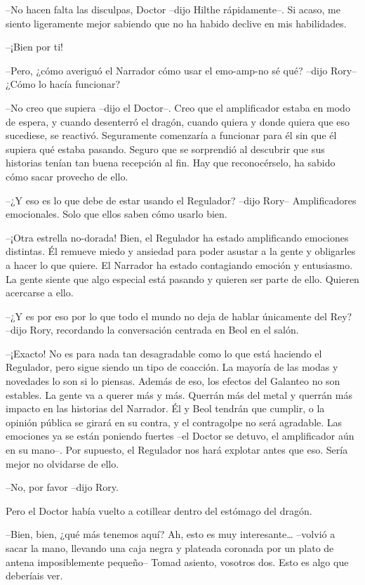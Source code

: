 {--No hacen falta las disculpas, Doctor --dijo Hilthe rápidamente--.
	Si acaso, me siento ligeramente mejor sabiendo que no ha habido declive
en mis habilidades.}

{--¡Bien por ti!}

{--Pero, ¿cómo averiguó el Narrador cómo usar el emo-amp-no sé qué?
--dijo Rory-- ¿Cómo lo hacía funcionar?}

{--No creo que supiera --dijo el Doctor--. Creo que el amplificador
	estaba en modo de espera, y cuando desenterró el dragón, cuando quiera y
	donde quiera que eso sucediese, se reactivó. Seguramente comenzaría a
	funcionar para él sin que él supiera qué estaba pasando. Seguro que se
	sorprendió al descubrir que sus historias tenían tan buena recepción al
fin. Hay que reconocérselo, ha sabido cómo sacar provecho de ello.}

{--¿Y eso es lo que debe de estar usando el Regulador? --dijo Rory--
Amplificadores emocionales. Solo que ellos saben cómo usarlo bien.}

{--¡Otra estrella no-dorada! Bien, el Regulador ha estado amplificando
	emociones distintas. Él remueve miedo y ansiedad para poder asustar a la
	gente y obligarles a hacer lo que quiere. El Narrador ha estado
	contagiando emoción y entusiasmo. La gente siente que algo especial está
pasando y quieren ser parte de ello. Quieren acercarse a ello.}

{--¿Y es por eso por lo que todo el mundo no deja de hablar únicamente
	del Rey? --dijo Rory, recordando la conversación centrada en Beol en el
salón.}

{--¡Exacto! No es para nada tan desagradable como lo que está haciendo
	el Regulador, pero sigue siendo un tipo de coacción. La mayoría de las
	modas y novedades lo son si lo piensas. Además de eso, los efectos del
	Galanteo no son estables. La gente va a querer más y más. Querrán más
	del metal y querrán más impacto en las historias del Narrador. Él y Beol
	tendrán que cumplir, o la opinión pública se girará en su contra, y el
	contragolpe no será agradable. Las emociones ya se están poniendo
	fuertes --el Doctor se detuvo, el amplificador aún en su mano--. Por
	supuesto, el Regulador nos hará explotar antes que eso. Sería mejor no
olvidarse de ello.}

{--No, por favor --dijo Rory.}

{Pero el Doctor había vuelto a cotillear dentro del estómago del
dragón.}

{--Bien, bien, ¿qué más tenemos aquí? Ah, esto es muy
	interesante\ldots{} --volvió a sacar la mano, llevando una caja negra y
	plateada coronada por un plato de antena imposiblemente pequeño-- Tomad
asiento, vosotros dos. Esto es algo que deberíais ver.}


